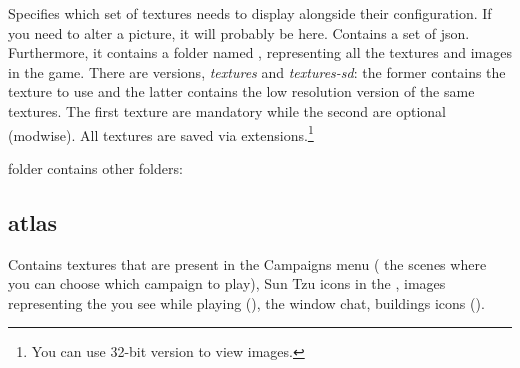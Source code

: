     Specifies which set of textures \aoe{} needs to display alongside their configuration. If you need to alter a picture, it will probably be here.
    Contains a set of json.
    Furthermore, it contains a folder named , representing all the textures and images in the game. There are versions, \textit{textures} and \textit{textures-sd}: the former contains the texture to use and the latter contains the low resolution version of the same textures. The first texture are mandatory while the second are optional (modwise). All textures are saved via  extensions.\footnote{You can use  32-bit version to view  images.}

     folder contains other folders:

    \subsection{atlas} 

    Contains textures that are present in the Campaigns menu (\eg{} the scenes where you can choose which campaign to play), Sun Tzu icons in the , images representing the  you see while playing (), the window chat, buildings icons ().

